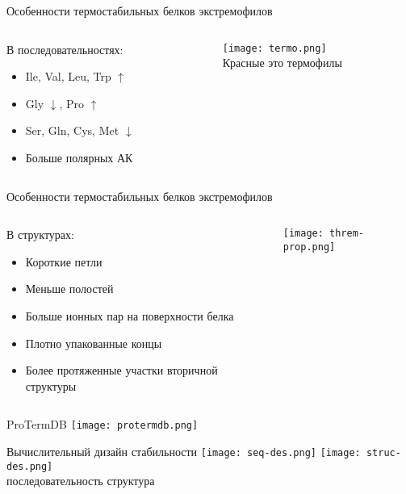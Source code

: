 \begin{frame}{Особенности термостабильных белков экстремофилов}
\begin{columns}
\begin{column}{0.4\textwidth}
    В последовательностях:
    \begin{itemize}
        \item Ile, Val, Leu, Trp $\uparrow$
        \item Gly $\downarrow$, Pro $\uparrow$ 
        \item Ser, Gln, Cys, Met $\downarrow$
        \item Больше полярных АК
    \end{itemize}
\end{column}
\begin{column}{0.6\textwidth}
    \texttt{[image: termo.png]}\\ \centering \footnotesize{Красные это термофилы}
\end{column}
\end{columns}
\end{frame}


\begin{frame}{Особенности термостабильных белков экстремофилов}
\begin{columns}
\begin{column}{0.3\textwidth}
    В структурах:
    \begin{itemize}
        \item Короткие петли
        \item Меньше полостей
        \item Больше ионных пар на поверхности белка
        \item Плотно упакованные концы
        \item Более протяженные участки вторичной структуры
    \end{itemize}
\end{column}
\begin{column}{0.7\textwidth}
    \texttt{[image: threm-prop.png]}
\end{column}
\end{columns}
\end{frame}


\begin{frame}{ProTermDB}
    \texttt{[image: protermdb.png]}
\end{frame}

\begin{frame}{Вычислительный дизайн стабильности}
    \centering
    \texttt{[image: seq-des.png]} 
    \texttt{[image: struc-des.png]} \\
    \centering
    последовательность \hspace{4cm}  структура
\end{frame}


